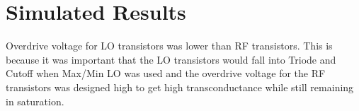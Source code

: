 \documentclass{article}                                                         %
\begin{document}
\section{Simulated Results}
\begin{table}[H]
  \small
  \centering
  \caption{Experiment Results-I}
  \hspace{1cm}
\end{table}

Overdrive voltage for LO transistors was lower than RF transistors. This is because it was important
that the LO transistors would fall into Triode and Cutoff when Max/Min LO was used and the overdrive
voltage for the RF transistors was designed high to get high transconductance while still remaining in saturation.
\end{document}
